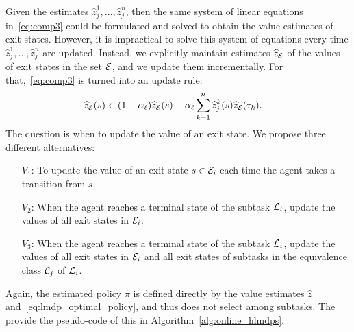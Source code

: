 Given the estimates $\widehat{z}_j^1,\ldots,\widehat{z}_j^n$, then the same system of linear equations in~\eqref{eq:comp3} could be formulated and solved to obtain the value estimates of exit states. However, it is impractical to solve this system of equations every time %
$\widehat{z}_j^1,\ldots,\widehat{z}_j^n$ are updated. Instead, we explicitly maintain estimates $\widehat{z}_{\mathcal{E}}$ of the values of exit states in the set $\mathcal{E}$, and we update them incrementally. 
For that,~\eqref{eq:comp3} is turned into an update rule:
\begin{align}\label{eq:comprule}
\widehat{z}_{\mathcal{E}}(s) \leftarrow &(1 - \alpha_\ell) \widehat{z}_{\mathcal{E}}(s) + \alpha_\ell \sum_{k=1}^n \widehat{z}_j^k(s) \widehat{z}_{\mathcal{E}}(\tau_k).
\end{align}
The question is when to update the value of an exit state. We propose three different alternatives:
\begin{itemize}
\item[$V_1$:] To update the value of an exit state $s\in\mathcal{E}_i$ each time the agent takes a transition from $s$.
\item[$V_2$:] When the agent reaches a terminal state of the subtask $\mathcal{L}_i$, update the values of all exit states in $\mathcal{E}_i$.
\item[$V_3$:] When the agent reaches a terminal state of the subtask $\mathcal{L}_i$, update the values of all exit states in $\mathcal{E}_i$ and all exit states of subtasks in the equivalence class $\mathcal{C}_j$ of $\mathcal{L}_i$.
\end{itemize}
Again, the estimated policy $\pi$ is defined directly by the value estimates $\widehat{z}$ and~\eqref{eq:lmdp_optimal_policy}, and thus does not select among subtasks. The provide the pseudo-code of this in Algorithm~\ref{alg:online_hlmdps}.

